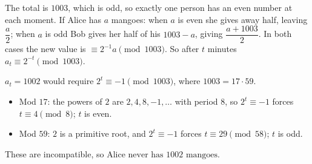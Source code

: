 The total is $1003$, which is odd, so exactly one person has an even number at each moment. If Alice has $a$ mangoes: when $a$ is even she gives away half, leaving $\dfrac a2$; when $a$ is odd Bob gives her half of his $1003-a$, giving $\dfrac{a+1003}{2}$. In both cases the new value is $\equiv2^{-1}a\pmod{1003}$. So after $t$ minutes $a_t\equiv2^{-t}\pmod{1003}$.

$a_t=1002$ would require $2^t\equiv-1\pmod{1003}$, where $1003=17\cdot59$.
\begin{itemize}
\item Mod $17$: the powers of $2$ are $2,4,8,-1,\dots$ with period $8$, so $2^t\equiv-1$ forces $t\equiv4\pmod8$; $t$ is even.
\item Mod $59$: $2$ is a primitive root, and $2^t\equiv-1$ forces $t\equiv29\pmod{58}$; $t$ is odd.
\end{itemize}
These are incompatible, so $\boxed{\text{Alice never has }1002\text{ mangoes}}$.
